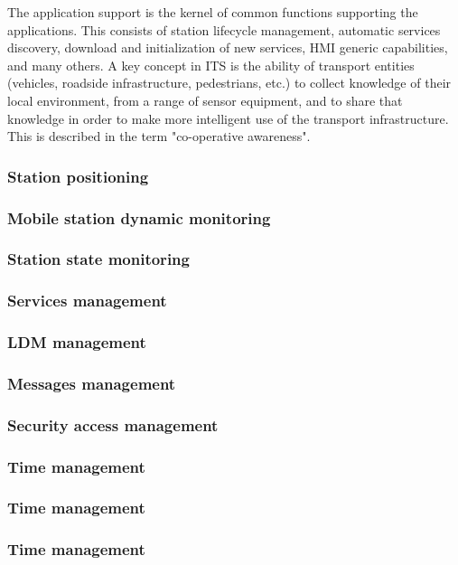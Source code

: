 The application support is the kernel of common functions supporting the applications. This consists of
station lifecycle management, automatic services discovery, download and initialization of new services,
HMI generic capabilities, and many others. A key concept in ITS is the ability of transport entities
(vehicles, roadside infrastructure, pedestrians, etc.) to collect knowledge of their local environment, from
a range of sensor equipment, and to share that knowledge in order to make more intelligent use of the
transport infrastructure. This is described in the term "co-operative awareness". 
\subsubsection{Station positioning}
\subsubsection{Mobile station dynamic monitoring}
\subsubsection{Station state monitoring}
\subsubsection{Services management }
\subsubsection{LDM management }
\subsubsection{Messages management}
\subsubsection{Security access management}
\subsubsection{Time management}
\subsubsection{Time management}
\subsubsection{Time management}

